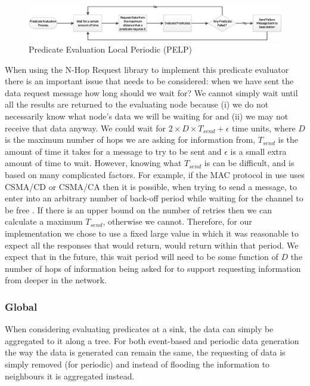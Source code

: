 \begin{figure}[H]
\centering
\includegraphics[width=\linewidth]{Diagrams/pelp.eps}
\caption{Predicate Evaluation Local Periodic (PELP)}
\end{figure}

When using the N-Hop Request library to implement this predicate evaluator there is an important issue that needs to be considered: when we have sent the data request message how long should we wait for? We cannot simply wait until all the results are returned to the evaluating node because (i) we do not necessarily know what node's data we will be waiting for and (ii) we may not receive that data anyway. We could wait for $2 \times D \times T_{send} + \epsilon$ time units, where $D$ is the maximum number of hops we are asking for information from, $T_{send}$ is the amount of time it takes for a message to try to be sent and $\epsilon$ is a small extra amount of time to wait. However, knowing what $T_{send}$ is can be difficult, and is based on many complicated factors. For example, if the MAC protocol in use uses CSMA/CD or CSMA/CA then it is possible, when trying to send a message, to enter into an arbitrary number of back-off period while waiting for the channel to be free \cite{?}. If there is an upper bound on the number of retries then we can calculate a maximum $T_{send}$, otherwise we cannot. Therefore, for our implementation we chose to use a fixed large value in which it was reasonable to expect all the responses that would return, would return within that period. We expect that in the future, this wait period will need to be some function of $D$ the number of hops of information being asked for to support requesting information from deeper in the network.


\subsubsection{Global}

When considering evaluating predicates at a sink, the data can simply be aggregated to it along a tree. For both event-based and periodic data generation the way the data is generated can remain the same, the requesting of data is simply removed (for periodic) and instead of flooding the information to neighbours it is aggregated instead.

